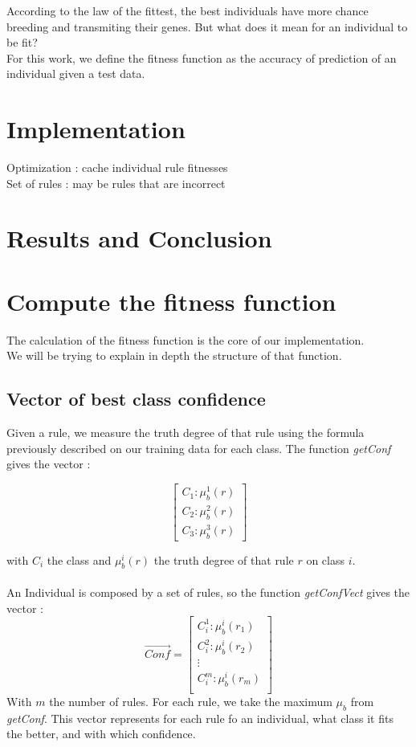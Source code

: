 \documentclass[a4paper,12pt]{article}
\begin{document}
According to the law of the fittest, the best individuals have more chance breeding and transmiting their genes. But what does it mean for an individual to be fit?\\
For this work, we define the fitness function as the accuracy of prediction of an individual given a test data.

\section{Implementation}

Optimization : cache individual rule fitnesses\\
Set of rules : may be rules that are incorrect 

\section{Results and Conclusion}




\section{Compute the fitness function}

The calculation of the fitness function is the core of our implementation.\\
We will be trying to explain in depth the structure of that function.

\subsection{Vector of best class confidence}

Given a rule, we measure the truth degree of that rule using the formula previously described on our training data for each class.
The function \textit{getConf} gives the vector :

\[
\begin{bmatrix}
C_1:\mu_b^1(r)\\
C_2:\mu_b^2(r)\\
C_3:\mu_b^3(r)
\end{bmatrix} \]

with $C_i$ the class and $\mu_b^i(r)$ the truth degree of that rule $r$ on class $i$.
\\
\\
An Individual is composed by a set of rules, so the function \textit{getConfVect} gives the vector :
\[
\vec{Conf}=
\begin{bmatrix}
C_i^1:\mu_b^i(r_1)\\
C_i^2:\mu_b^i(r_2)\\
\vdots\\
C_i^m:\mu_b^i(r_m)\\
\end{bmatrix} \]
With $m$ the number of rules. For each rule, we take the maximum $\mu_b$ from \textit{getConf}. This vector represents for each rule fo an individual, what class it fits the better, and with which confidence.
\end{document}
